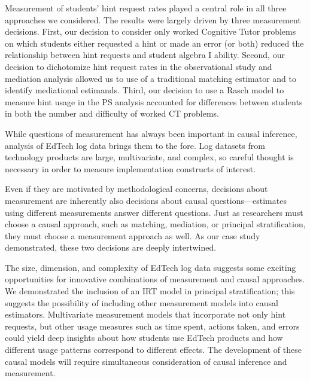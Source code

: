 \documentclass{article}\usepackage[]{graphicx}\usepackage[]{color}
\begin{document}
Measurement of students' hint request rates played a central role in all three approaches we considered.
The results were largely driven by three measurement decisions.
First, our decision to consider only worked Cognitive Tutor problems on which students either requested a hint or made an error (or both) reduced the relationship between hint requests and student algebra I ability.
Second, our decision to dichotomize hint request rates in the observational study and mediation analysis allowed us to use of a traditional matching estimator and to identify mediational estimands.
Third, our decision to use a Rasch model to measure hint usage in the PS analysis accounted for differences between students in both the number and difficulty of worked CT problems.

While questions of measurement has always been important in causal inference, analysis of EdTech log data brings them to the fore.
Log datasets from technology products are large, multivariate, and complex, so careful thought is necessary in order to measure implementation constructs of interest.

Even if they are motivated by methodological concerns, decisions about measurement are inherently also decisions about causal questions---estimates using different measurements answer different questions.
Just as researchers must choose a causal approach, such as matching, mediation, or principal stratification, they must choose a measurement approach as well.
As our case study demonstrated, these two decisions are deeply intertwined.

The size, dimension, and complexity of EdTech log data suggests some exciting opportunities for innovative combinations of measurement and causal approaches.
We demonstrated the inclusion of an IRT model in principal stratification; this suggests the possibility of including other measurement models into causal estimators.
Multivariate measurement models that incorporate not only hint requests, but other usage measures such as time spent, actions taken, and errors could yield deep insights about how students use EdTech products and how different usage patterns correspond to different effects.
The development of these causal models will require simultaneous consideration of causal inference and measurement.

\end{document}
